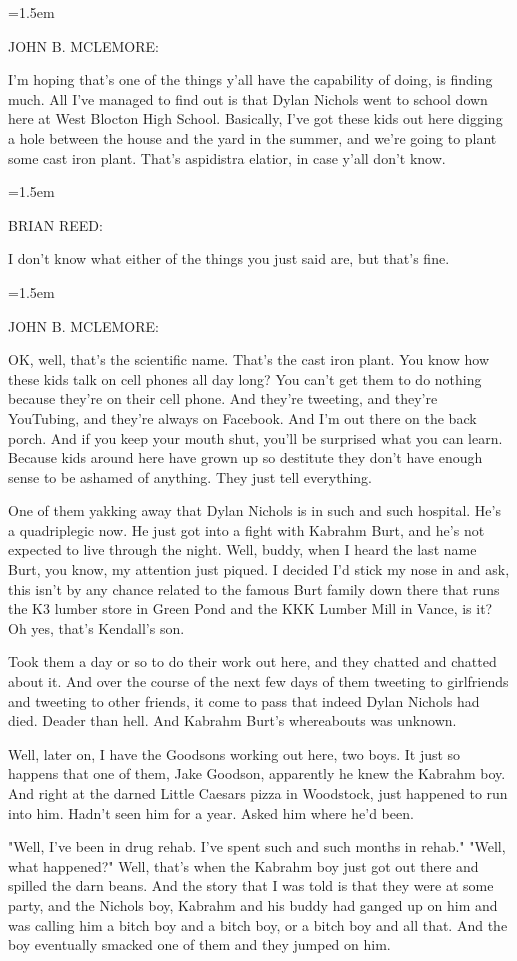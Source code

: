 \documentclass[10pt,a4paper]{article}
\newcommand{\speakerlabel}[1]{{\plantin\color{speakerblue}\MakeUppercase{#1}:}}
\newenvironment{speech}[1]{%
		\par\medskip
		\begin{list}{}{%
			\leftmargin=1.5em
			\rightmargin=0pt
			\topsep=0pt
			\partopsep=0pt
			\parsep=0.5\baselineskip
			\itemsep=0pt}%
		\item\speakerlabel{#1}\enspace\ignorespaces
	}{\end{list}}
\begin{document}
\begin{speech}{JOHN B. McLEMORE}
I'm hoping that's one of the things y'all have the capability of doing, is finding much. All I've managed to find out is that Dylan Nichols went to school down here at West Blocton High School. Basically, I've got these kids out here digging a hole between the house and the yard in the summer, and we're going to plant some cast iron plant. That's aspidistra elatior, in case y'all don't know.
\end{speech}
\begin{speech}{BRIAN REED}
I don't know what either of the things you just said are, but that's fine.
\end{speech}
\begin{speech}{JOHN B. McLEMORE}
OK, well, that's the scientific name. That's the cast iron plant. You know how these kids talk on cell phones all day long? You can't get them to do nothing because they're on their cell phone. And they're tweeting, and they're YouTubing, and they're always on Facebook. And I'm out there on the back porch. And if you keep your mouth shut, you'll be surprised what you can learn. Because kids around here have grown up so destitute they don't have enough sense to be ashamed of anything. They just tell everything.

One of them yakking away that Dylan Nichols is in such and such hospital. He's a quadriplegic now. He just got into a fight with Kabrahm Burt, and he's not expected to live through the night. Well, buddy, when I heard the last name Burt, you know, my attention just piqued. I decided I'd stick my nose in and ask, this isn't by any chance related to the famous Burt family down there that runs the K3 lumber store in Green Pond and the KKK Lumber Mill in Vance, is it? Oh yes, that's Kendall's son.

Took them a day or so to do their work out here, and they chatted and chatted about it. And over the course of the next few days of them tweeting to girlfriends and tweeting to other friends, it come to pass that indeed Dylan Nichols had died. Deader than hell. And Kabrahm Burt's whereabouts was unknown.

Well, later on, I have the Goodsons working out here, two boys. It just so happens that one of them, Jake Goodson, apparently he knew the Kabrahm boy. And right at the darned Little Caesars pizza in Woodstock, just happened to run into him. Hadn't seen him for a year. Asked him where he'd been.

"Well, I've been in drug rehab. I've spent such and such months in rehab." "Well, what happened?" Well, that's when the Kabrahm boy just got out there and spilled the darn beans. And the story that I was told is that they were at some party, and the Nichols boy, Kabrahm and his buddy had ganged up on him and was calling him a bitch boy and a bitch boy, or a bitch boy and all that. And the boy eventually smacked one of them and they jumped on him.


\end{speech}
\end{document}
